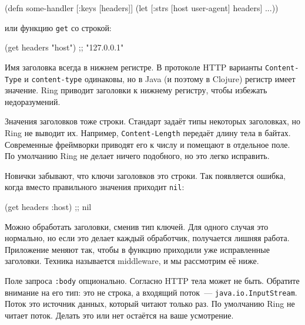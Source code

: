 \begin{english}
  \begin{clojure}
(defn some-handler
  [{:keys [headers]}]
  (let [{:strs [host user-agent]} headers]
    ...))
  \end{clojure}
\end{english}


\noindent
или функцию \verb|get| со строкой:

\begin{english}
  \begin{clojure}
(get headers "host") ;; "127.0.0.1"
  \end{clojure}
\end{english}


Имя заголовка всегда в нижнем регистре. В протоколе HTTP варианты
\verb|Content-Type| и \verb|content-type| одинаковы, но в Java (и поэтому в
Clojure) регистр имеет значение. Ring приводит заголовки к нижнему регистру,
чтобы избежать недоразумений.

Значения заголовков тоже строки. Стандарт задаёт типы некоторых заголовках,
но Ring не выводит их. Например, \verb|Content-Length| передаёт длину тела в
байтах. Современные фреймворки приводят его к числу и помещают в отдельное
поле. По умолчанию Ring не делает ничего подобного, но это легко исправить.

Новички забывают, что ключи заголовков это строки. Так появляется ошибка, когда
вместо правильного значения приходит \verb|nil|:

\begin{english}
  \begin{clojure}
(get headers :host) ;; nil
  \end{clojure}
\end{english}

Можно обработать заголовки, сменив тип ключей. Для одного случая это
нормально, но если это делает каждый обработчик, получается лишняя
работа. Приложение меняют так, чтобы в функцию приходили уже исправленные
заголовки. Техника называется middleware, и мы рассмотрим её ниже.


Поле запроса \verb|:body| опционально. Согласно HTTP тела может не
быть. Обратите внимание на его тип: это не строка, а входящий поток~---
\verb|java.io.InputStream|. Поток это источник данных, который читают только
раз. По умолчанию Ring не читает поток. Делать это или нет остаётся на ваше
усмотрение.


